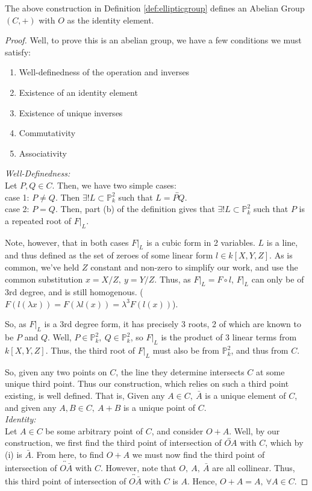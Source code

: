 \begin{theorem}
The above construction in Definition \ref{def:ellipticgroup} defines
an Abelian Group $(C,+)$ with $O$ as the identity element.
\end{theorem}

\begin{proof}
Well, to prove this is an abelian group, we have a few conditions we must satisfy:
\begin{enumerate}
\item Well-definedness of the operation and inverses
\item Existence of an identity element
\item Existence of unique inverses
\item Commutativity
\item Associativity
\end{enumerate}

\emph{Well-Definedness:}\\
Let $P, Q \in C$. Then, we have two simple cases:\\

case 1:  $P \ne Q$. Then $\exists! L \subset \mathbb{P}^2_k$ such that $L = \overleftrightarrow{PQ}$.\\

case 2: $P = Q$. Then, part (b) of the definition gives that $\exists! L \subset \mathbb{P}^2_k$ such that
$P$ is a repeated root of $F|_L$.

Note, however, that in both cases $F|_L$ is a cubic form in 2 variables. $L$ is 
a line, and thus defined as the set of zeroes of some linear form $l \in k[X,Y,Z]$. As is common, we've
held $Z$ constant and non-zero to simplify our work, and use the common substitution
$x=X/Z,~y=Y/Z$. Thus, as $F|_L = F \circ l$, $F|_L$ can only be of 3rd degree,
and is still homogenous. ($F(l(\lambda x)) = F(\lambda l(x)) = \lambda^3 F(l(x))$).

So, as $F|_L$ is a 3rd degree form, it has precisely 3 roots, 2 of which
are known to be $P$ and $Q$. Well, $P \in \mathbb{P}^2_k,~Q\in \mathbb{P}^2_k$,
so $F|_L$ is the product of 3 linear terms from $k[X,Y,Z]$. Thus, the
third root of $F|_L$ must also be from $\mathbb{P}^2_k$, and thus from $C$.

So, given any two points on $C$, the line they determine intersects $C$ at some unique third point.
Thus our construction, which relies on such a third point existing, is well defined. That is,
Given any $A \in C,~\bar{A}$ is a unique element of $C$, and given any $A, B \in C,~A+B$ 
is a unique point of $C$.\\

\emph{Identity:}\\
Let $A \in C$ be some arbitrary point of $C$, and consider $O+A$.
Well, by our construction, we first find the third point
of intersection of $\overleftrightarrow{OA}$ with $C$, which by (i)
is $\bar{A}$. From here, to find $O+A$ we must now find the
third point of intersection of $\overleftrightarrow{O\bar{A}}$ with $C$. However, note
that $O,~A,~\bar{A}$ are all collinear. Thus, this third point
of intersection of $\overleftrightarrow{O\bar{A}}$ with $C$ is $A$. Hence, $O+A=A,~\forall A \in C$.

\end{proof}
